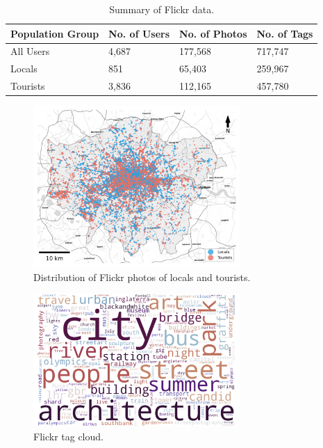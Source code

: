 \documentclass{article}
\begin{document}
\begin{table}
\centering
\caption{\label{tab:flickr_preprocessed}Summary of Flickr data.}
\begin{tabular}{llll} \hline
Population Group & No. of Users & No. of Photos & No. of Tags \\ \hline
All Users & 4,687 & 177,568 & 717,747 \\
Locals & 851 & 65,403 & 259,967 \\
Tourists & 3,836 & 112,165 & 457,780 \\ \hline
\end{tabular}
\end{table}

\begin{figure}
\centering
\includegraphics[width=0.7\textwidth]{figures/flickr_distribution.png}
\caption{\label{fig:flickr_distribution}Distribution of Flickr photos of locals and tourists.}
\end{figure}

\begin{figure}
\centering
\includegraphics[width=0.7\textwidth]{figures/flickr_tag_cloud.png}
\caption{\label{fig:flickr_tag_cloud}Flickr tag cloud.}
\end{figure}
\end{document}
